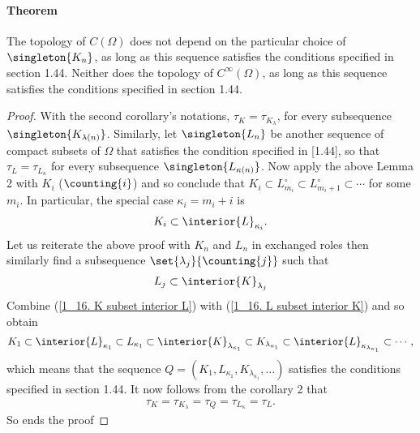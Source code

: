 \paragraph{Theorem} 
The topology of $C(\Omega)$ does not depend on the particular choice of 
$\singleton{K_n}$, as long as this sequence satisfies the conditions 
specified in section 1.44. Neither does the topology of $C^\infty (\Omega)$, 
as long as this sequence satisfies the conditions specified in section 1.44.
%
\begin{proof}%
With the second corollary's notations,
% 
  $\tau_{K} = \tau_{K_\lambda}$,
%
for every subsequence $\singleton{K_{\lambda(n)}}$.
% 
Similarly, let 
%
  $\singleton{L_n}$ 
% 
be another sequence of compact subsets of $\Omega$ that satisfies 
the condition specified in [1.44], 
so that 
%
  $\tau_{L} = \tau_{L_\kappa}$
%
for every subsequence $\singleton{L_{\kappa(n)}}$. 
%
Now apply the above Lemma 2 with $K_i$ ($\counting{i}$) and so conclude that  
%
  $K_i 
    \subset 
  L^\circ_{m_i} 
    \subset 
  L^\circ_{m_{i}+1}
    \subset
  \cdots$
%  
for some $m_i$. In particular, the special case $\kappa_i = m_i + i$ is 
%
  \begin{align}
    \label{1_16. K subset interior L}
    K_i
      \subset 
    \interior{L}_{\kappa_i}.
  \end{align} 
%
Let us reiterate the above proof with $K_n$ and $L_n$ in exchanged roles 
then similarly find a subsequence $\set{\lambda_j}{\counting{j}}$ such that 
%
  \begin{align}
  \label{1_16. L subset interior K}
    L_j \subset \interior{K}_{\lambda_j}
  \end{align}
%
Combine 
%
  (\ref{1_16. K subset interior L}) with 
  (\ref{1_16. L subset interior K}) 
%
and so obtain
%
  \begin{align}
    K_1 
      \subset 
    \interior{L}_{\kappa_1} 
      \subset 
    L_{\kappa_1} 
      \subset 
    \interior{K}_{\lambda_{\kappa_1}}
      \subset 
    K_{\lambda_{\kappa_1}}
      \subset
    \interior{L}_{\kappa_{\lambda_{\kappa_1}}}
      \subset
    \cdots, 
  \end{align}
%
which means that the sequence 
%
  $Q = (
    K_1, 
    L_{\kappa_1}, 
    K_{\lambda_{\kappa_1}}, 
    \dots
  )$
%
satisfies the conditions specified in section 1.44. 
It now follows from the corollary 2 that 
%
  \begin{align}  
    \tau_{K} 
    = 
      \tau_{K_\lambda} 
    = 
      \tau_{Q} 
    = 
      \tau_{L_\kappa} 
    = \tau_{L}.
  \end{align} 
%
So ends the proof
\end{proof}
